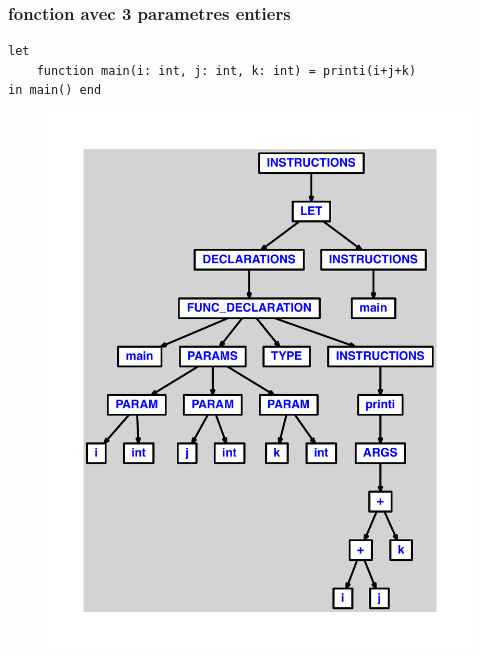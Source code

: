 \documentclass{article}
\begin{document}
\subsubsection{fonction avec 3 parametres entiers}
\begin{lstlisting}
let
	function main(i: int, j: int, k: int) = printi(i+j+k)
in main() end
\end{lstlisting}
\newpage
\begin{figure}[H]
\centering
\includegraphics[max width=\textwidth]{ast/ast_235.pdf}
\end{figure}
\newpage
\end{document}
